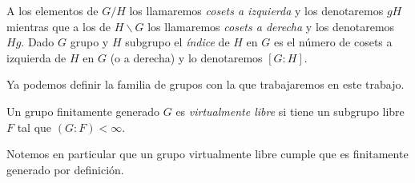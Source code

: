 \documentclass[tesis.tex]{subfiles}
\begin{document}
A los elementos de $G/H$ los llamaremos \emph{cosets a izquierda} y los denotaremos $gH$ mientras que a los de $H \backslash G$ los llamaremos \emph{cosets a derecha} y los denotaremos $Hg$.
Dado $G$ grupo y $H$ subgrupo el \emph{índice} de $H$ en $G$ es el número de cosets a izquierda de $H$ en $G$ (o a derecha) y lo denotaremos $[G:H]$.


Ya podemos definir la familia de grupos con la que trabajaremos en este trabajo.

\begin{deff}
	Un grupo finitamente generado $G$ es \emph{virtualmente libre} si tiene un subgrupo libre $F$ tal que $(G:F) < \infty$.
\end{deff}

Notemos en particular que un grupo virtualmente libre cumple que es finitamente generado por definición.
\end{document}
